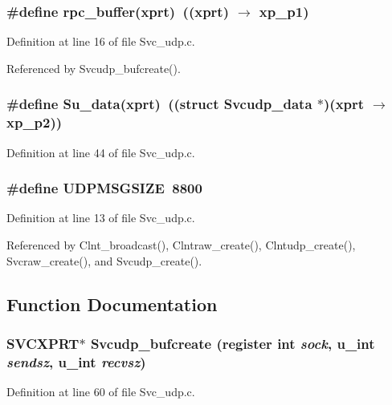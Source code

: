 \subsubsection{\setlength{\rightskip}{0pt plus 5cm}\#define rpc\_\-buffer(xprt)\ ((xprt) $\rightarrow$ xp\_\-p1)}\label{Svc__udp_8c_a1}




Definition at line 16 of file Svc\_\-udp.c.

Referenced by Svcudp\_\-bufcreate().
\subsubsection{\setlength{\rightskip}{0pt plus 5cm}\#define Su\_\-data(xprt)\ ((struct {\bf Svcudp\_\-data} $\ast$)(xprt $\rightarrow$ xp\_\-p2))}\label{Svc__udp_8c_a2}




Definition at line 44 of file Svc\_\-udp.c.
\subsubsection{\setlength{\rightskip}{0pt plus 5cm}\#define UDPMSGSIZE\ 8800}\label{Svc__udp_8c_a0}




Definition at line 13 of file Svc\_\-udp.c.

Referenced by Clnt\_\-broadcast(), Clntraw\_\-create(), Clntudp\_\-create(), Svcraw\_\-create(), and Svcudp\_\-create().

\subsection{Function Documentation}
\subsubsection{\setlength{\rightskip}{0pt plus 5cm}SVCXPRT$\ast$ Svcudp\_\-bufcreate (register int {\em sock}, u\_\-int {\em sendsz}, u\_\-int {\em recvsz})}\label{Svc__udp_8c_a10}




Definition at line 60 of file Svc\_\-udp.c.

